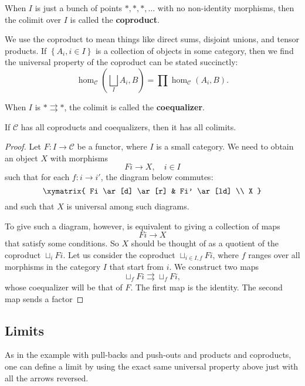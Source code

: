 \begin{proposition}
\begin{definition}
When $I$ is just a bunch of points  $\ast, \ast, \ast, \dots$ with no
non-identity morphisms, then the
colimit over $I$ is called the \textbf{coproduct}.
\end{definition}

We use the coproduct to mean things like direct sums, disjoint unions, and
tensor products.
If $\left\{A_i, i \in I\right\}$ is a collection of objects in some category,
then we find the universal property of the coproduct can be stated succinctly:
\[ \hom_{\mathcal{C}}(\bigsqcup_I A_i, B) = \prod \hom_{\mathcal{C}}(A_i, B).  \]

\begin{definition}
When $I$ is $\ast \rightrightarrows \ast$, the colimit is called the
\textbf{coequalizer}.
\end{definition}

\begin{theorem} \label{coprodcoequalsufficeforcocomplete}
If $\mathcal{C}$ has all coproducts and coequalizers, then it has all colimits.
\end{theorem}

\begin{proof}
Let $F: I \to \mathcal{C}$ be a functor, where $I$ is a small category. We
need to obtain an object $X$ with morphisms
\[ Fi \to X, \quad i \in I  \]
such that for each $f: i \to i'$, the diagram below commutes:
\[
\xymatrix{
Fi \ar[d] \ar[r] &  Fi' \ar[ld] \\
X
}
\]
and such that $X$ is universal among such diagrams.

To give such a diagram, however, is equivalent to giving a collection of maps
\[ Fi \to X  \]
that satisfy some conditions. So $X$ should be thought of as a quotient of the
coproduct $\sqcup_i Fi$.
Let us consider the coproduct $\sqcup_{i \in I, f} Fi$, where $f$ ranges over
all
morphisms in the category $I$ that start from $i$.
We construct two maps
\[ \sqcup_f Fi \rightrightarrows \sqcup_f Fi,  \]
whose coequalizer will be that of $F$. The first map is the identity. The
second map sends a factor
\end{proof}

\subsection{Limits}
As in the example with pull-backs and push-outs and products and coproducts,
one can define a limit by using the exact same universal property above
just with
all the arrows reversed.


\end{proposition}

